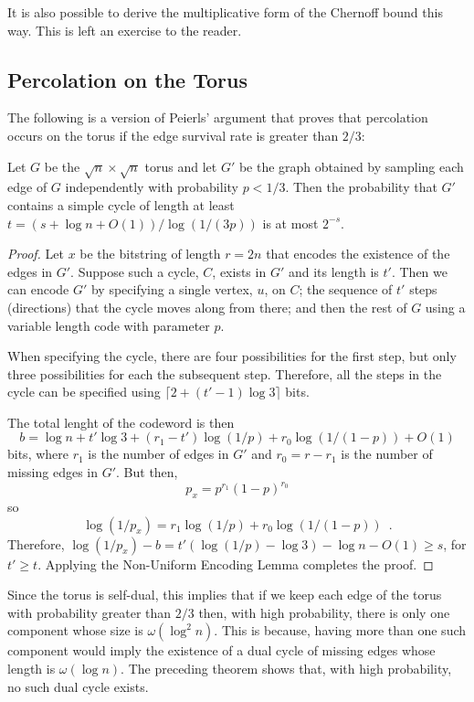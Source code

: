 \documentclass{patmorin}
\begin{document}
It is also possible to derive the multiplicative form of the Chernoff
bound this way. This is left an exercise to the reader.

\subsection{Percolation on the Torus}

The following is a version of Peierls' argument that proves that
percolation occurs on the torus if the edge survival rate is greater
than $2/3$:

\begin{thm}
  Let $G$ be the $\sqrt n\times\sqrt n$ torus and let $G'$ be the graph
  obtained by sampling each edge of $G$ independently with probability
  $p<1/3$.  Then the probability that $G'$ contains a simple cycle of
  length at least $t=(s+\log n+O(1))/\log(1/(3p))$ is at most $2^{-s}$.
\end{thm}

\begin{proof}
  Let $x$ be the bitstring of length $r=2n$ that encodes the existence
  of the edges in $G'$.  Suppose such a cycle, $C$, exists in $G'$
  and its length is $t'$.  Then we can encode $G'$ by specifying a
  single vertex, $u$, on $C$; the sequence of $t'$ steps (directions)
  that the cycle moves along from there; and then the rest of $G$ using
  a variable length code with parameter $p$.

  When specifying the cycle, there are four possibilities for the first
  step, but only three possibilities for each the subsequent step. Therefore,
  all the steps in the cycle can be specified using $\lceil 2+(t'-1)\log
  3\rceil$ bits.

  The total lenght of the codeword is then
  \[
      b = \log n + t'\log 3 + (r_1-t')\log(1/p) + r_0\log(1/(1-p)) + O(1) 
  \]
  bits, where $r_1$ is the number of edges in $G'$ and $r_0=r-r_1$
  is the number of missing edges in $G'$.  But then,
  \[
     p_x = p^{r_1}(1-p)^{r_0}
  \]
  so 
  \[
     \log(1/p_x) = r_1\log(1/p) + r_0\log(1/(1-p)) \enspace .
  \]
  Therefore, $\log(1/p_x)-b = t'(\log(1/p)-\log 3) - \log n - O(1)\ge
  s$, for $t'\ge t$.  Applying the Non-Uniform Encoding Lemma completes
  the proof.
\end{proof}

Since the torus is self-dual, this implies that if we keep each edge of the torus with probability greater than $2/3$ then, with high probability, there is only one component whose size is $\omega(\log^2 n)$.  This is because, having more than one such component would imply the existence of a dual cycle of missing edges whose length is $\omega(\log n)$.  The preceding theorem shows that, with high probability, no such dual cycle exists.
\end{document}
